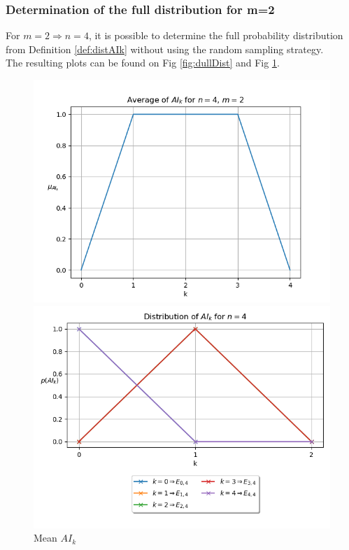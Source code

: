 \documentclass[11pt]{llncs}
\begin{document}
\subsubsection{Determination of the full distribution for \texorpdfstring{m=2}{m=2}}
For $m=2 \Rightarrow n = 4$, it is possible to determine the full probability distribution from Definition \ref{def:distAIk} without using the random sampling strategy.\\
The resulting plots can be found on Fig \ref{fig:dullDist} and Fig \ref{fig:averagesFullDist}. %

\begin{figure}[ht]
    \centering
    \begin{minipage}[b]{0.45\textwidth}
        \centering
        \includegraphics[width=\textwidth]{images/WPB_2_sample_size_full_dist.png}
        \caption{Mean $AI_k$}
        \label{fig:averagesFullDist}
    \end{minipage}
    \hfill
    \begin{minipage}[b]{0.5\textwidth}
        \centering
        \includegraphics[width=\textwidth]{images/WPB_2_sample_size_full_dist_prob.png}

\end{minipage}
\end{figure}
\end{document}
